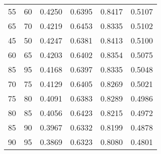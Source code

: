 \begin{center}
\begin{longtable}{|l|l|l|l|l|l|}
55 & 60 & 0.4250 & 0.6395 & 0.8417 & 0.5107 \\
65 & 70 & 0.4219 & 0.6453 & 0.8335 & 0.5102 \\
45 & 50 & 0.4247 & 0.6381 & 0.8413 & 0.5100 \\
60 & 65 & 0.4203 & 0.6402 & 0.8354 & 0.5075 \\
85 & 95 & 0.4168 & 0.6397 & 0.8335 & 0.5048 \\
70 & 75 & 0.4129 & 0.6405 & 0.8269 & 0.5021 \\
75 & 80 & 0.4091 & 0.6383 & 0.8289 & 0.4986 \\
80 & 85 & 0.4056 & 0.6423 & 0.8215 & 0.4972 \\
85 & 90 & 0.3967 & 0.6332 & 0.8199 & 0.4878 \\
90 & 95 & 0.3869 & 0.6323 & 0.8080 & 0.4801
\end{longtable}

\end{center}


